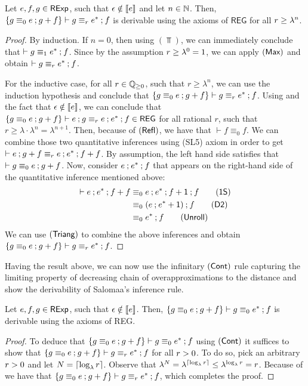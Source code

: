 \begin{lemma}\label{c2:lem:star_lemma}
Let $e,f,g \in \mathsf{RExp}$, such that $\epsilon \notin \left\llbracket{e}\right\rrbracket$ and let $n \in \mathbb{N}$. Then, $ \{g \equiv_0 e \mathbin{;} g  + f\} \vdash g \equiv_{r} e^{\ast} \mathbin{;} f$ is derivable using the axioms of $\mathsf{REG}$ for all $r \geq \lambda^n $.
\end{lemma}
\begin{proof}
	By induction. If $n = 0$, then using $(\Top)$, we can immediately conclude that $\vdash g \equiv_1 e^{\ast} \mathbin{;} f$. Since by the assumption $r \geq \lambda^0 = 1$, we can apply $(\textsf{Max})$ and obtain $\vdash g \equiv_{r} e^\ast \mathbin{;} f $.
	
	For the inductive case, for all $r \in \mathbb{Q}_{\geq 0}$, such that $r \geq \lambda^n$, we can use the induction hypothesis and conclude that $\{g \equiv_0 e \mathbin{;} g  + f\} \vdash g \equiv_{r} e^{\ast} \mathbin{;} f$. Using  and the fact that $\epsilon \notin \left\llbracket{e}\right\rrbracket$, we can conclude that $\{g \equiv_0 e \mathbin{;} g  + f\} \vdash e \mathbin{;} g \equiv_{r} e \mathbin{;} e^\ast \mathbin{;} f \in \mathsf{REG}$ for all rational $r$, such that $r \geq \lambda \cdot \lambda^n = \lambda^{n + 1}$. Then, because of $(\textsf{Refl})$, we have that $\vdash f \equiv_0 f$. We can combine those two quantitative inferences using \textsf{(SL5)} axiom in order to get $\vdash e \mathbin{;} g + f \equiv_{r} e \mathbin{;} e^\ast \mathbin{;} f  + f $. By assumption, the left hand side satisfies that $\vdash g \equiv_0 e \mathbin{;} g + f$. Now, consider $e \mathbin{;} e^\ast \mathbin{;} f$ that appears on the right-hand side of the quantitative inference mentioned above:
	\begin{align*}
		\vdash e \seq e^{\ast} \seq f + f &\equiv_0 e \seq e^\ast \seq f + \one \seq f \tag{\textsf{1S}} \\
		&\equiv_0 (e \seq e^* + \one) \seq f \tag{\textsf{D2}} \\
		&\equiv_0 e^{*} \seq f \tag{\textsf{Unroll}}
	\end{align*}
	We can use $(\textsf{Triang})$ to combine the above inferences and obtain $\{g \equiv_0 e \mathbin{;} g  + f\} \vdash g \equiv_{r} e^\ast \mathbin{;} f$.
\end{proof}
Having the result above, we can now use the infinitary $(\textsf{Cont})$ rule capturing the limiting property of decreasing chain of overapproximations to the distance and show the derivability of Salomaa's inference rule.
\begin{lemma}
	Let $e,f,g \in \mathsf{RExp}$, such that $\epsilon \notin \left\llbracket{e}\right\rrbracket$. Then, $\{g \equiv_0 e \mathbin{;} g + f\} \vdash g \equiv_{0} e^{\ast} \mathbin{;} f$ is derivable using the axioms of \textsf{REG}.

\end{lemma}
\begin{proof}
To deduce that $\{g \equiv_0 e \mathbin{;} g  + f\} \vdash g \equiv_0 e^{\ast} \mathbin{;} f$ using $(\textsf{Cont})$ it suffices to show that $\{g \equiv_0 e \mathbin{;} g  + f\} \vdash g \equiv_{r} e^{\ast} \mathbin{;} f$ for all $r > 0$.  To do so, pick an arbitrary $r > 0$ and let $N = \lceil \log_{\lambda} r \rceil$. Observe that $\lambda^N = \lambda^{\lceil \log_{\lambda} r \rceil} \leq \lambda^{\log_{\lambda} r} = r$. Because of  we have that $\{g \equiv_0 e \mathbin{;} g  + f\} \vdash g \equiv_{r} e^{\ast} \mathbin{;} f$, which completes the proof.
\end{proof}
